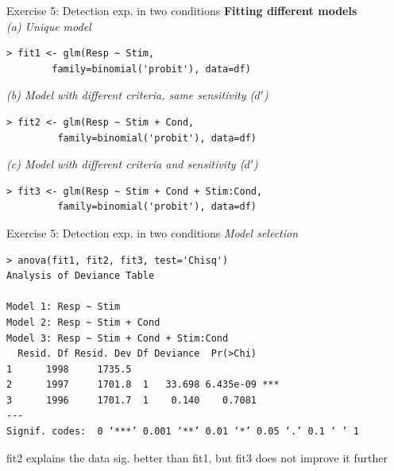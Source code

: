 \documentclass[10pt]{beamer}
\begin{document}
\begin{frame}[fragile]{Exercise 5: Detection exp. in two conditions}
\textbf{Fitting different models}\\[10pt]
\textit{(a) Unique model}
\begin{verbatim}
> fit1 <- glm(Resp ~ Stim, 
        family=binomial('probit'), data=df)
\end{verbatim}

\textit{(b) Model with different criteria, same sensitivity ($d'$)}
\begin{verbatim}
> fit2 <- glm(Resp ~ Stim + Cond, 
         family=binomial('probit'), data=df)
\end{verbatim}

\textit{(c) Model with different criteria and sensitivity ($d'$)}
\begin{verbatim}
> fit3 <- glm(Resp ~ Stim + Cond + Stim:Cond, 
         family=binomial('probit'), data=df)
\end{verbatim}

\end{frame}


\begin{frame}[fragile]{Exercise 5: Detection exp. in two conditions}
\textit{Model selection}

\begin{verbatim}
> anova(fit1, fit2, fit3, test='Chisq')
Analysis of Deviance Table

Model 1: Resp ~ Stim
Model 2: Resp ~ Stim + Cond
Model 3: Resp ~ Stim + Cond + Stim:Cond
  Resid. Df Resid. Dev Df Deviance  Pr(>Chi)    
1      1998     1735.5                          
2      1997     1701.8  1   33.698 6.435e-09 ***
3      1996     1701.7  1    0.140    0.7081    
---
Signif. codes:  0 ‘***’ 0.001 ‘**’ 0.01 ‘*’ 0.05 ‘.’ 0.1 ‘ ’ 1
\end{verbatim}



\alert{fit2 explains the data sig. better than fit1, but fit3 does not improve it further}
\end{frame}
\end{document}
